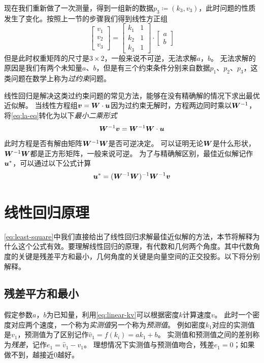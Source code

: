 现在我们重新做了一次测量，得到一组新的数据$p_3\coloneqq(k_3, v_3)$，此时问题的性质发生了变化。按照上一节的步骤我们得到线性方正组
\begin{equation}\label{eq:la-kv-3}
    \begin{bmatrix}
        v_1\\
        v_2\\
        v_3
    \end{bmatrix}=
    \begin{bmatrix}
        k_1 & 1\\
        k_2 & 1\\
        k_3 & 1
    \end{bmatrix}\cdot
    \begin{bmatrix}
        a\\
        b
    \end{bmatrix}
\end{equation}
但是此时权重矩阵的尺寸是$3\times2$，一般来说不可逆，无法求解$a$，$b$。
无法求解的原因是我们有两个未知量$a$、$b$，但是有三个约束条件分别来自数据$p_1$、$p_2$、$p_3$，这类问题在数学上称为\emph{过约束}问题。

线性回归是解决这类过约束问题的常见方法，能够在没有精确解的情况下求出最优近似解。
当线性方程组$\bm{v}=\bm{W}\cdot\bm{u}$因为过约束无解时，方程两边同时乘以$\bm{W}^{-1}$，将\cref{eq:la-eq}转化为以下\emph{最小二乘形式}
\begin{equation}\label{eq:least-square}
    \bm{W}^{-1}\bm{v}=\bm{W}^{-1}\bm{W}\cdot\bm{u}
\end{equation}
此时方程是否有解由矩阵$\bm{W}^{-1}\bm{W}$是否可逆决定。
可以证明无论$\bm{W}$是什么形状，$\bm{W}^{-1}\bm{W}$都是正方形矩阵，一般来说可逆。
为了与精确解区别，最佳近似解记作$\bm{u}^*$，可以通过以下公式计算
\begin{equation}
    \bm{u}^*=(\bm{W}^{-1}\bm{W})^{-1}\bm{W}^{-1}\bm{v}
\end{equation}

\section{线性回归原理}

\cref{eq:least-square}中我们直接给出了线性回归求解最佳近似解的方法，本节将解释为什么这个公式有效。要理解线性回归的原理，有代数和几何两个角度。其中代数角度的关键是残差平方和最小，几何角度的关键是向量空间的正交投影。以下将分别解释。

\subsection{残差平方和最小}
假定参数$a$，$b$为已知量，利用\cref{eq:linear-kv}可以根据密度$k$计算速度$v$。
此时一个密度对应两个速度，一个称为\emph{实测值}另一个称为\emph{预测值}。
例如密度$k_1$对应的实测值是$v_1$，预测值为了区别记作$\hat{v}_1=f(k_i)=ak_1+b$。
\nolinebreak{}%
实测值和预测值之间的差别称为\emph{残差}，记作$e_1=\hat{v}_1-v_1$。
理想情况下实测值与预测值吻合，残差$e_1=0$；如果做不到，越接近$0$越好。

